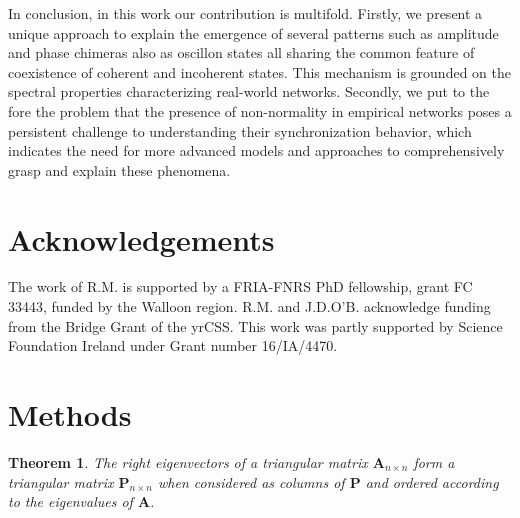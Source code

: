 \documentclass[prx,twocolumn,amsmath,noshowkeys,noshowpacs,amssymb]{revtex4-2}
\newtheorem{theorem}{Theorem}
\begin{document}
In conclusion, in this work our contribution is multifold. Firstly, we present a unique approach to explain the emergence of several patterns such as amplitude and phase chimeras also as oscillon states all sharing the common feature of coexistence of coherent and incoherent states. This mechanism is grounded on the spectral properties characterizing real-world networks. Secondly, we put to the fore the problem that the presence of non-normality in empirical networks poses a persistent challenge to understanding their synchronization behavior, which indicates the need for more advanced models and approaches to comprehensively grasp and explain these phenomena.




\section*{Acknowledgements}
The work of R.M. is supported by a FRIA-FNRS PhD fellowship, grant FC 33443, funded by the Walloon region. R.M. and J.D.O'B. acknowledge funding from the Bridge Grant of the yrCSS. This work was partly supported by Science Foundation Ireland under Grant number 16/IA/4470.


\section*{Methods}
\label{sec:AppA}
\noindent
\begin{theorem}
The right eigenvectors of a triangular matrix $\textbf{A}_{n\times n}$ form a triangular matrix $\textbf{P}_{n\times n}$ when considered as columns of $\textbf{P}$ and ordered according to the eigenvalues of $\textbf{A}$. 
\end{theorem}
\end{document}
